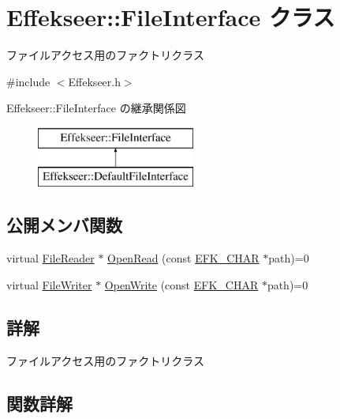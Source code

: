\hypertarget{class_effekseer_1_1_file_interface}{}\section{Effekseer\+:\+:File\+Interface クラス}
\label{class_effekseer_1_1_file_interface}


ファイルアクセス用のファクトリクラス  




{\ttfamily \#include $<$Effekseer.\+h$>$}

Effekseer\+:\+:File\+Interface の継承関係図\begin{figure}[H]
\begin{center}
\leavevmode
\includegraphics[height=2.000000cm]{class_effekseer_1_1_file_interface}
\end{center}
\end{figure}
\subsection*{公開メンバ関数}
\begin{DoxyCompactItemize}
\item 
virtual \mbox{\hyperlink{class_effekseer_1_1_file_reader}{File\+Reader}} $\ast$ \mbox{\hyperlink{class_effekseer_1_1_file_interface_ad8744ad57226d9a2ce74f6ef6e2f9a41}{Open\+Read}} (const \mbox{\hyperlink{_effekseer_8h_a50b026abea014b47854bcd835b3b6233}{E\+F\+K\+\_\+\+C\+H\+AR}} $\ast$path)=0
\item 
virtual \mbox{\hyperlink{class_effekseer_1_1_file_writer}{File\+Writer}} $\ast$ \mbox{\hyperlink{class_effekseer_1_1_file_interface_a1e60cb81a5cae39b37e44570ef693d91}{Open\+Write}} (const \mbox{\hyperlink{_effekseer_8h_a50b026abea014b47854bcd835b3b6233}{E\+F\+K\+\_\+\+C\+H\+AR}} $\ast$path)=0
\end{DoxyCompactItemize}


\subsection{詳解}
ファイルアクセス用のファクトリクラス 

\subsection{関数詳解}
\mbox{\label{class_effekseer_1_1_file_interface_ad8744ad57226d9a2ce74f6ef6e2f9a41}} 
